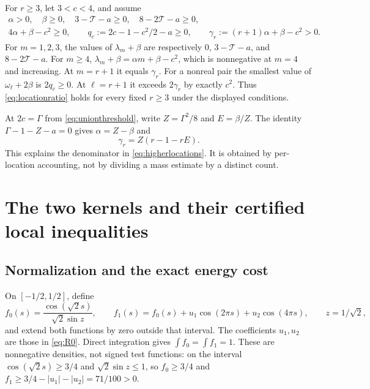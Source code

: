 \documentclass[11pt]{amsart}
\numberwithin{equation}{section}
\begin{document}
For $r\ge3$, let $3<c<4$, and assume
\begin{gather}
 \alpha>0,\quad\beta\ge0,\quad
 3-\mathcal T-a\ge0,\quad8-2\mathcal T-a\ge0,\label{eq:guardsr1}\\
 4\alpha+\beta-c^2\ge0,\qquad
 q_c:=2c-1-c^2/2-a\ge0,\qquad
 \gamma_r:=(r+1)\alpha+\beta-c^2>0.\label{eq:guardsr2}
\end{gather}
For $m=1,2,3$, the values of $\lambda_m+\beta$ are respectively
$0$, $3-\mathcal T-a$, and $8-2\mathcal T-a$. For $m\ge4$,
$\lambda_m+\beta=\alpha m+\beta-c^2$, which is nonnegative
at $m=4$ and increasing. At $m=r+1$ it equals $\gamma_r$.
For a nonreal pair the smallest value of $\omega_\ell+2\beta$
is $2q_c\ge0$. At $\ell=r+1$ it exceeds $2\gamma_r$ by
exactly $c^2$. Thus \eqref{eq:locationratio} holds for every fixed
$r\ge3$ under the displayed conditions.

At $2c=\Gamma$ from \eqref{eq:unionthreshold}, write
$Z=\Gamma^2/8$ and $E=\beta/Z$. The identity
$\Gamma-1-Z-a=0$ gives $\alpha=Z-\beta$ and
\begin{equation}
 \gamma_r=Z(r-1-rE).\label{eq:gammar}
\end{equation}
This explains the denominator in \eqref{eq:higherlocations}. It is
obtained by per-location accounting, not by dividing a mass estimate
by a distinct count.

\section{The two kernels and their certified local inequalities}
\label{sec:kernels}

\subsection{Normalization and the exact energy cost}

On $[-1/2,1/2]$, define
\begin{equation}
 f_0(s)=\frac{\cos(\sqrt2s)}{\sqrt2\sin z},\qquad
 f_1(s)=f_0(s)+u_1\cos(2\pi s)+u_2\cos(4\pi s),
 \qquad z=1/\sqrt2,\label{eq:densities}
\end{equation}
and extend both functions by zero outside that interval. The coefficients
$u_1,u_2$ are those in \eqref{eq:R0}. Direct integration gives
$\int f_0=\int f_1=1$. These are nonnegative densities, not signed
test functions: on the interval $\cos(\sqrt2s)\ge3/4$ and
$\sqrt2\sin z\le1$, so $f_0\ge3/4$ and
$f_1\ge3/4-|u_1|-|u_2|=71/100>0$.
\end{document}
